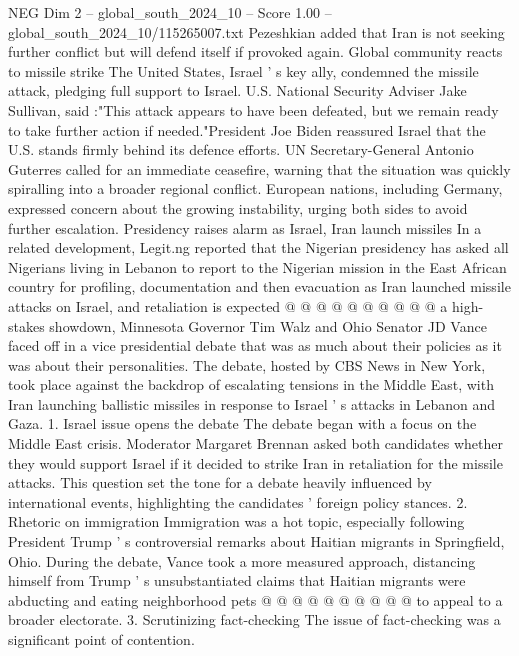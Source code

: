 \begin{textsample}{NEG Dim 2 – global\_south\_2024\_10 – Score 1.00 – global\_south\_2024\_10/115265007.txt}  \label{ex:f2_neg_313}
Pezeshkian added that Iran is not seeking further conflict but will defend itself if provoked again.
Global community reacts to missile strike The United States, Israel ' s key ally, condemned the missile attack, pledging full support to Israel.
U.S.
National Security Adviser Jake Sullivan, said :"This attack appears to have been defeated, but we remain ready to take further action if needed."President Joe Biden reassured Israel that the U.S. stands firmly behind its defence efforts.
UN Secretary-General Antonio Guterres called for an immediate ceasefire, warning that the situation was quickly spiralling into a broader regional conflict.
European nations, including Germany, expressed concern about the growing instability, urging both sides to avoid further escalation.
Presidency raises alarm as Israel, Iran launch missiles In a related development, Legit.ng reported that the Nigerian presidency has asked all Nigerians living in Lebanon to report to the Nigerian mission in the East African country for profiling, documentation and then evacuation as Iran launched missile attacks on Israel, and retaliation is expected @ @ @ @ @ @ @ @ @ @ a high-stakes showdown, Minnesota Governor Tim Walz and Ohio Senator JD Vance faced off in a vice presidential debate that was as much about their policies as it was about their personalities.
The debate, hosted by CBS News in New York, took place against the backdrop of escalating tensions in the Middle East, with Iran launching ballistic missiles in response to Israel ' s attacks in Lebanon and Gaza. 1.
Israel issue opens the debate The debate began with a focus on the Middle East crisis.
Moderator Margaret Brennan asked both candidates whether they would support Israel if it decided to strike Iran in retaliation for the missile attacks.
This question set the tone for a debate heavily influenced by international events, highlighting the candidates ' foreign policy stances. 2.
Rhetoric on immigration Immigration was a hot topic, especially following President Trump ' s controversial remarks about Haitian migrants in Springfield, Ohio.
During the debate, Vance took a more measured approach, distancing himself from Trump ' s unsubstantiated claims that Haitian migrants were abducting and eating neighborhood pets @ @ @ @ @ @ @ @ @ @ to appeal to a broader electorate. 3.
Scrutinizing fact-checking The issue of fact-checking was a significant point of contention.

\end{textsample}
